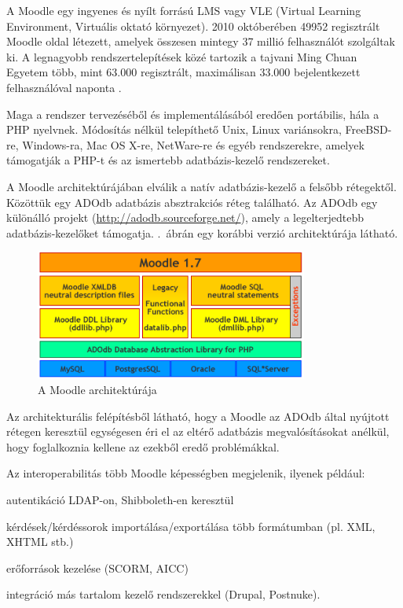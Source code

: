 A Moodle  egy ingyenes és nyílt forrású LMS vagy VLE (Virtual Learning Environment, Virtuális oktató környezet). 2010 októberében 49952 regisztrált Moodle oldal létezett, amelyek összesen mintegy 37 millió felhasználót szolgáltak ki. A legnagyobb rendszertelepítések közé tartozik a tajvani Ming Chuan Egyetem több, mint 63.000 regisztrált, maximálisan 33.000 bejelentkezett felhasználóval naponta \cite{moodleinstplus}.

Maga a rendszer tervezéséből és implementálásából eredően portábilis, hála a PHP nyelvnek. Módosítás nélkül telepíthető Unix, Linux variánsokra, FreeBSD-re, Windows-ra, Mac OS X-re, NetWare-re és egyéb rendszerekre, amelyek támogatják a PHP-t és az ismertebb adatbázis-kezelő rendszereket.

A Moodle architektúrájában elválik a natív adatbázis-kezelő a felsőbb rétegektől. Közöttük egy ADOdb adatbázis absztrakciós réteg található. Az ADOdb egy különálló projekt (\href{http://adodb.sourceforge.net/}{http://adodb.sourceforge.net/}), amely a legelterjedtebb adatbázis-kezelőket támogatja. .~ábrán egy korábbi verzió architektúrája látható.

\begin{figure}[h!]
\centering
\includegraphics[width=0.8\textwidth]{figures/moodlearch.png}
\caption{A Moodle architektúrája \label{fig:moodlearch}}
\end{figure}

Az architekturális felépítésből látható, hogy a Moodle az ADOdb által nyújtott rétegen keresztül egységesen éri el az eltérő adatbázis megvalósításokat anélkül, hogy foglalkoznia kellene az ezekből eredő problémákkal.  

Az interoperabilitás több Moodle képességben megjelenik, ilyenek például:
\begin{sajat_itemize}
\setlength{\itemsep}{0pt}
\item autentikáció LDAP-on, Shibboleth-en keresztül
\item kérdések/kérdéssorok importálása/exportálása több formátumban (pl. XML, XHTML stb.)
\item erőforrások kezelése (SCORM, AICC)
\item integráció más tartalom kezelő rendszerekkel (Drupal, Postnuke).
\end{sajat_itemize}

